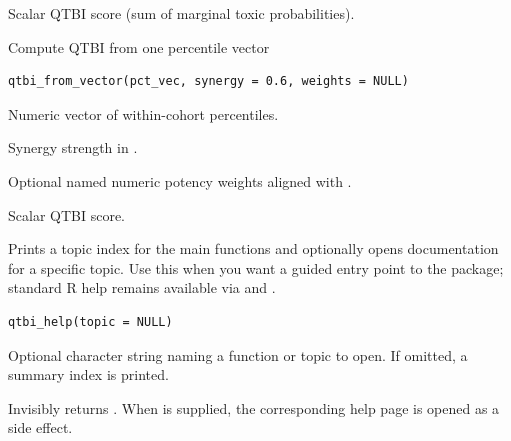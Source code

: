 \documentclass[a4paper]{book}
\begin{document}
%
\begin{Value}
Scalar QTBI score (sum of marginal toxic probabilities).
\end{Value}
%
\begin{Description}
Compute QTBI from one percentile vector
\end{Description}
%
\begin{Usage}
\begin{verbatim}
qtbi_from_vector(pct_vec, synergy = 0.6, weights = NULL)
\end{verbatim}
\end{Usage}
%
\begin{Arguments}
\begin{ldescription}
\item[\code{pct\_vec}] Numeric vector of within-cohort percentiles.

\item[\code{synergy}] Synergy strength in \AsIs{\texttt{[0, 1]}}.

\item[\code{weights}] Optional named numeric potency weights aligned with .
\end{ldescription}
\end{Arguments}
%
\begin{Value}
Scalar QTBI score.
\end{Value}
%
\begin{Description}
Prints a topic index for the main  functions and optionally opens
documentation for a specific topic. Use this when you want a guided entry
point to the package; standard R help remains available via 
and .
\end{Description}
%
\begin{Usage}
\begin{verbatim}
qtbi_help(topic = NULL)
\end{verbatim}
\end{Usage}
%
\begin{Arguments}
\begin{ldescription}
\item[\code{topic}] Optional character string naming a function or topic to open.
If omitted, a summary index is printed.
\end{ldescription}
\end{Arguments}
%
\begin{Value}
Invisibly returns . When  is supplied, the corresponding
help page is opened as a side effect.
\end{Value}
\end{document}
